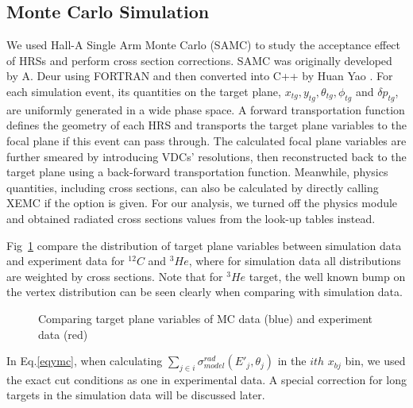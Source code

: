 \documentclass[a4paper,10.5pt]{report}
\begin{document}
\subsection{Monte Carlo Simulation}
We used Hall-A Single Arm Monte Carlo (SAMC) to study the acceptance effect of HRSs and perform cross section corrections. SAMC was originally developed by A. Deur \cite{A_Duer} using FORTRAN and then converted into C++ by Huan Yao \cite{Huan_Yao}. For each simulation event, its quantities on the target plane, $x_{tg},y_{tg}, \theta_{tg}, \phi_{tg}$ and $\delta p_{tg}$, are uniformly generated in a wide phase space. A forward transportation function defines the geometry of each HRS and transports the target plane variables to the focal plane if this event can pass through. The calculated focal plane variables are further smeared by introducing VDCs' resolutions, then reconstructed back to the target plane using a back-forward transportation function. Meanwhile, physics quantities, including cross sections, can also be calculated by directly calling XEMC if the option is given. For our analysis, we turned off the physics module and obtained radiated cross sections values from the look-up tables instead.

Fig~\ref{samc_tg} compare the distribution of target plane variables between simulation data and experiment data for $^{12}C$ and $^{3}He$, where for simulation data all distributions are weighted by cross sections. Note that for $^{3}He$ target, the well known bump on the vertex distribution can be seen clearly when comparing with simulation data.

\begin{figure}[!ht]
 \begin{center}
\hfill
 \caption[Comparing MC data and experiment data]{Comparing target plane variables of MC data (blue) and experiment data (red)}
 \label{samc_tg}
\end{center}
\end{figure}
  
In Eq.\ref{eqymc}, when calculating $\sum_{j\in i}\sigma^{rad}_{model}(E'_{j},\theta_{j})$ in the $ith$ $x_{bj}$ bin, we used the exact cut conditions as one in experimental data. A special correction for long targets in the simulation data will be discussed later.
\end{document}

